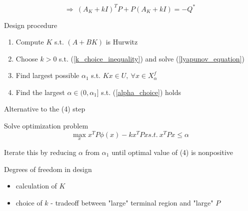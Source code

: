 \begin{equation}\label{lyapunov_equation}
\Rightarrow\ (A_K + kI)^TP + P(A_K + kI) = - Q^*
\end{equation}

Design procedure 
\begin{enumerate}
\item Compute $K$ s.t. $(A+BK)$ is Hurwitz 
\item Choose $k > 0$ s.t. (\ref{k_choice_inequality}) and solve (\ref{lyapunov_equation})
\item Find largest possible $\alpha_1$ s.t. $Kx \in U, \ \forall x \in X^f_{\alpha}$ 
\item Find the largest $\alpha \in (0,\alpha_1]$ s.t. (\ref{alpha_choice}) holds
\end{enumerate}

Alternative to the (4) step

Solve optimization problem 
\begin{equation}
\max_{x} x^TP\phi(x) - kx^TPx s.t. \ x^TPx \leq \alpha
\end{equation}

Iterate this by reducing $\alpha$ from $\alpha_1$ until optimal value of (4) is nonpositive

Degrees of freedom in design
\begin{itemize}
\item calculation of $K$
\item choice of $k$ - tradeoff between "large" terminal region and "large" $P$
\end{itemize}
